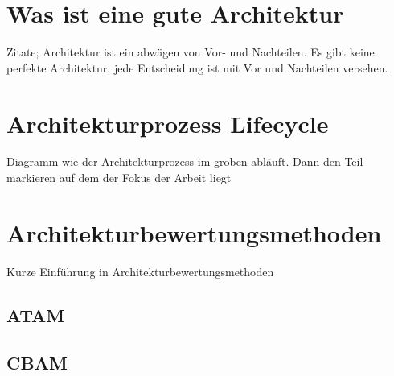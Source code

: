 \section{Was ist eine gute Architektur}
Zitate; Architektur ist ein abwägen von Vor- und Nachteilen. Es gibt keine perfekte Architektur, jede Entscheidung ist mit Vor und Nachteilen versehen.

\section{Architekturprozess Lifecycle}
Diagramm wie der Architekturprozess im groben abläuft. Dann den Teil markieren auf dem der Fokus der Arbeit liegt

\section{Architekturbewertungsmethoden}
Kurze Einführung in Architekturbewertungsmethoden

\subsection{ATAM}
\subsection{CBAM}